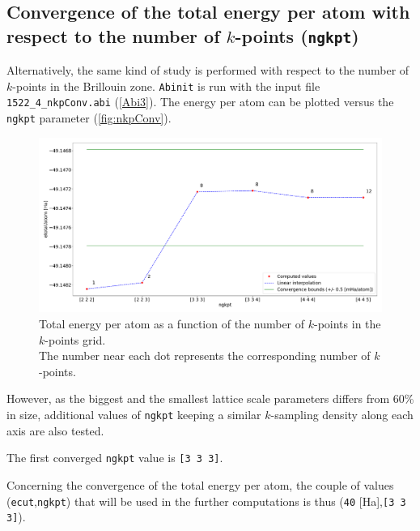 \documentclass[11pt,a4paper]{article}
\begin{document}
\subsection{Convergence of the total energy per atom with respect to the number of $k$-points (\texttt{ngkpt})}
\label{convEtotNkpt}
Alternatively, the same kind of study is performed with respect to the number of $k$-points in the Brillouin zone. \texttt{Abinit} is run with the input file \texttt{1522\_4\_nkpConv.abi} (\autoref{Abi3}). The energy per atom can be plotted versus the \texttt{ngkpt} parameter (\autoref{fig:nkpConv}).
\begin{figure}[h]
\includegraphics[width=\textwidth]{images/etotngkpt.pdf}
\caption{Total energy per atom as a function of the number of $k$-points in the $k$-points grid.\\
The number near each dot represents the corresponding number of $k$-points.
}
\label{fig:nkpConv}
\end{figure}
However, as the biggest and the smallest lattice scale parameters differs from 60\% in size, additional values of \texttt{ngkpt} keeping a similar $k$-sampling density along each axis are also tested.

The first converged \texttt{ngkpt} value is \texttt{[3 3 3]}.

Concerning the convergence of the total energy per atom, the couple of values (\texttt{ecut},\texttt{ngkpt}) that will be used in the further computations is thus (\texttt{40} [Ha],\texttt{[3 3 3]}).
\end{document}
